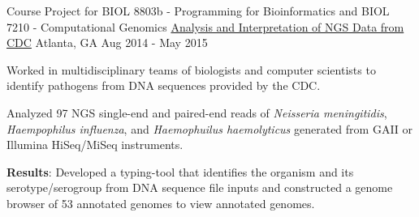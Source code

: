\begin{cventries}
\cventry
{Course Project for BIOL 8803b - Programming for Bioinformatics and BIOL 7210 - Computational Genomics} %
{\href{http://gbrowse2015.biology.gatech.edu/Home.html}{Analysis and Interpretation of NGS Data from CDC}} %
{Atlanta, GA} %
{Aug 2014 - May 2015} %
{
	\begin{cvitems} %
		\item Worked in multidisciplinary teams of biologists and computer scientists to identify pathogens from DNA sequences provided by the CDC.
		\item Analyzed 97 NGS single-end and paired-end reads of \textit{Neisseria meningitidis}, \textit{Haempophilus influenza}, and \textit{Haemophuilus haemolyticus} generated from GAII or Illumina HiSeq/MiSeq instruments.
		\item {\bf Results}: Developed a typing-tool that identifies the organism and its serotype/serogroup from DNA sequence file inputs and constructed a genome browser of 53 annotated genomes to view annotated genomes.
	\end{cvitems}
}


\vspace{-4.0mm}
\end{cventries}
